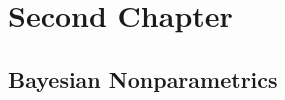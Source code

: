\chapter{Second Chapter}
\blindtext

\section{Bayesian Nonparametrics}
\Blindtext
\Blindtext
\Blindtext